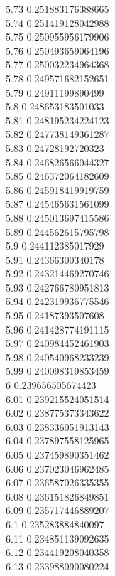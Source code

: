 {5.73	0.251883176388665\\
5.74	0.251419128042988\\
5.75	0.250955956179906\\
5.76	0.250493659064196\\
5.77	0.250032234964368\\
5.78	0.249571682152651\\
5.79	0.24911199890499\\
5.8	0.248653183501033\\
5.81	0.248195234224123\\
5.82	0.247738149361287\\
5.83	0.24728192720323\\
5.84	0.246826566044327\\
5.85	0.246372064182609\\
5.86	0.245918419919759\\
5.87	0.245465631561099\\
5.88	0.245013697415586\\
5.89	0.244562615795798\\
5.9	0.244112385017929\\
5.91	0.24366300340178\\
5.92	0.243214469270746\\
5.93	0.242766780951813\\
5.94	0.242319936775546\\
5.95	0.24187393507608\\
5.96	0.241428774191115\\
5.97	0.240984452461903\\
5.98	0.240540968233239\\
5.99	0.240098319853459\\
6	0.239656505674423\\
6.01	0.239215524051514\\
6.02	0.238775373343622\\
6.03	0.238336051913143\\
6.04	0.237897558125965\\
6.05	0.237459890351462\\
6.06	0.237023046962485\\
6.07	0.236587026335355\\
6.08	0.236151826849851\\
6.09	0.235717446889207\\
6.1	0.235283884840097\\
6.11	0.234851139092635\\
6.12	0.234419208040358\\
6.13	0.233988090080224\\
}

